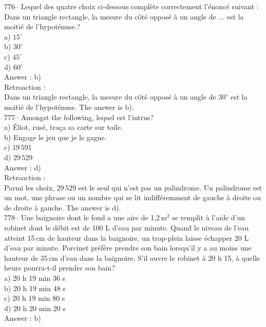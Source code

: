 ﻿\documentclass[letterpaper, 12pt]{article}
\begin{document}
776-- Lequel des quatre choix ci-dessous compl\`ete correctement
l'\'enonc\'e suivant : \og Dans un triangle rectangle, la mesure du
c\^ot\'e oppos\'e \`a un angle de $\ldots$ est la moiti\'e de l'hypot\'enuse.\fg ?\\
a) $15^{\circ}$\\
b) $30^{\circ}$\\
c) $45^{\circ}$\\
d) $60^{\circ}$\\

Answer : b)\\

Retroaction : \\
Dans un triangle rectangle, la mesure du c\^ot\'e oppos\'e \`a un angle de
$30^{\circ}$ est la moiti\'e de l'hypot\'enuse.  The answer is b).\\


777-- Amongst the following, lequel est l'intrus?\\
a) \'Eliot, rus\'e, tra\c ca sa carte sur toile.\\
b) Engage le jeu que je le gagne.\\
c) $19\,591$\\
d) $29\,529$\\

Answer : d)\\

Retroaction : \\
Parmi les choix, $29\,529$ est le seul qui n'est pas un palindrome.  Un
palindrome est un mot, une phrase ou un nombre qui se lit indiff\'eremment
de gauche \`a droite ou de droite \`a gauche.  The answer is d).\\

778-- Une baignoire dont le fond a une aire de 1,2\,m$^{2}$ se remplit \`a
l'aide d'un robinet dont le d\'ebit est de 100 L d'eau par minute.  Quand le
niveau de l'eau atteint 15\,cm de hauteur dans la baignoire, un trop-plein
laisse \'echapper 20 L d'eau par minute.  Porcinet pr\'ef\`ere prendre son
bain lorsqu'il y a au moins une hauteur de 35\,cm d'eau dans la baignoire.
S'il ouvre le robinet \`a 20 h 15, \`a quelle heure pourra-t-il prendre son
bain?\\
a) 20 h 19 min 36 s\\
b) 20 h 19 min 48 s\\
c) 20 h 19 min 80 s\\
d) 20 h 20 min 20 s\\


Answer : b)\\
\end{document}
